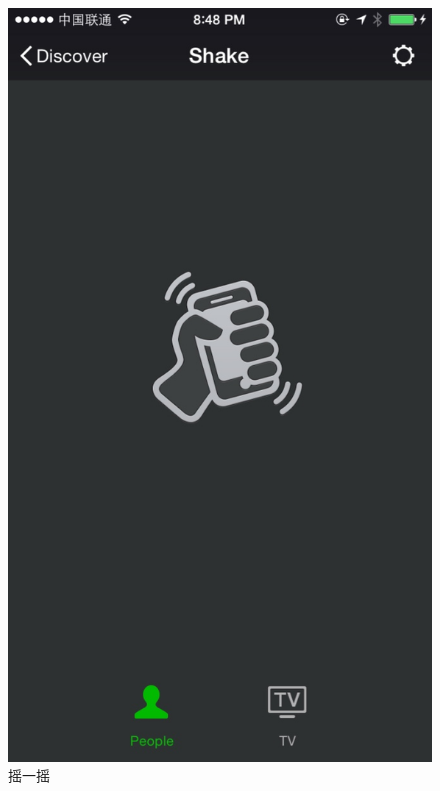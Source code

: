 \begin{figure}[h] 
\begin{minipage}[t]{0.25\linewidth}
\centering
\includegraphics[width=\textwidth]{img/chap1/shake.jpg}
\caption{摇一摇\label{flickr}}
\end{minipage}
\hfill
\begin{minipage}[t]{0.25\linewidth}
\centering

\end{minipage}
\end{figure}
